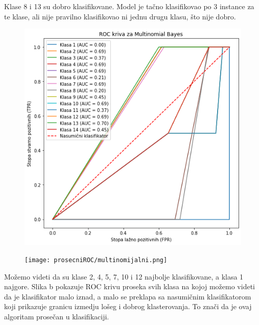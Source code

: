 \documentclass{article}
\begin{document}
\begin{flushleft}

Klase 8 i 13 su dobro klasifikovane. Model je tačno klasifikovao po 3 instance za te klase, ali nije pravilno klasifikovao ni jednu drugu klasu, što nije dobro.



\begin{figure}[ht]
    \centering
    \begin{minipage}{0.5\textwidth}
        \centering
        \includegraphics[width=\textwidth]{MbROC.png}
        \renewcommand{\thefigure}{} 
        \captionsetup{labelformat=empty}
        \label{fig:udeo1}
    \end{minipage}\hfill
    \begin{minipage}{0.5\textwidth}
        \centering
        \texttt{[image: prosecniROC/multinomijalni.png]}
        \renewcommand{\thefigure}{} 
        \captionsetup{labelformat=empty}
        \label{fig:udeo2}
    \end{minipage}
\end{figure}


Možemo videti da su klase 2, 4, 5, 7, 10 i 12  najbolje klasifikovane, a klasa 1 najgore. Slika b pokazuje ROC krivu proseka svih klasa na kojoj možemo videti da je klasifikator malo iznad, a malo se preklapa sa nasumičnim klasifikatorom koji prikazuje granicu izmedju lošeg i dobrog klasterovanja. To znači da je ovaj algoritam prosečan u klasifikaciji.
\end{flushleft}
\end{document}
